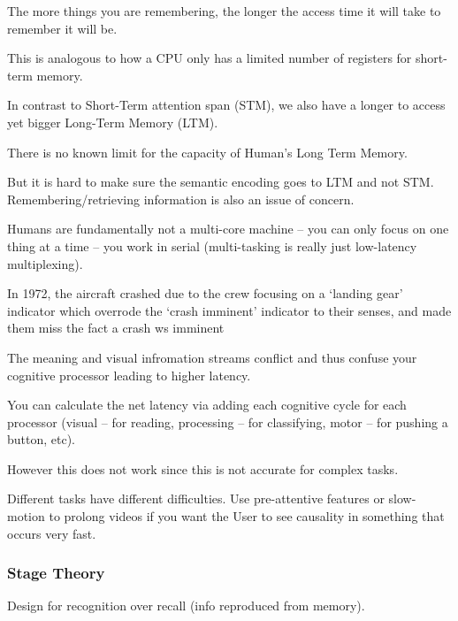 The more things you are remembering, the longer the access time it will take to remember it will be.

This is analogous to how a CPU only has a limited number of registers for short-term memory.

In contrast to Short-Term attention span (STM), we also have a longer to access yet bigger Long-Term Memory (LTM).

\begin{shaded}
    There is no known limit for the capacity of Human's Long Term Memory.

    But it is hard to make sure the semantic encoding goes to LTM and not STM. Remembering/retrieving information is also an issue of concern.
\end{shaded}

Humans are fundamentally not a multi-core machine -- you can only focus on one thing at a time -- you work in serial (multi-tasking is really just low-latency multiplexing).

In 1972, the aircraft crashed due to the crew focusing on a `landing gear' indicator which overrode the `crash imminent' indicator to their senses, and made them miss the fact a crash ws imminent

The meaning and visual infromation streams conflict and thus confuse your cognitive processor leading to higher latency.

You can calculate the net latency via adding each cognitive cycle for each processor (visual -- for reading, processing -- for classifying, motor -- for pushing a button, etc).

\begin{important}
    However this does not work since this is not accurate for complex tasks.
\end{important}

Different tasks have different difficulties. Use pre-attentive features or slow-motion to prolong videos if you want the User to see causality in something that occurs very fast.

\subsubsection{Stage Theory}
Design for recognition %
over recall (info reproduced from memory).

